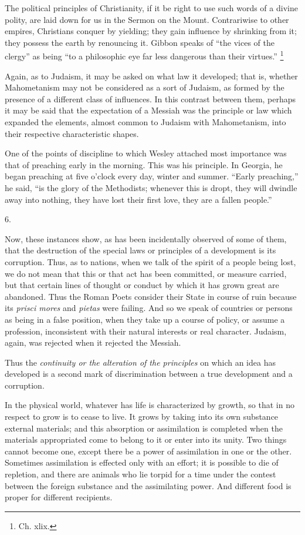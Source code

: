 The political principles of Christianity, if it be
right to use such words of a divine polity, are laid down
for us in the Sermon on the Mount. Contrariwise to other
empires, Christians conquer by yielding; they gain
influence by shrinking from it; they possess the earth by
renouncing it. Gibbon speaks of ``the vices of the
clergy'' as being ``to a philosophic eye far less
dangerous than their virtues.'' \footnote{Ch. xlix.}

Again, as to Judaism, it may be asked on what law it
developed; that is, whether Mahometanism may not be
considered as a sort of Judaism, as formed by the
presence of a different class of influences. In this
contrast between them, perhaps it may be said that the
expectation of a Messiah was the principle or law which
expanded the elements, almost common to Judaism with
Mahometanism, into their respective characteristic
shapes.

One of the points of discipline to which Wesley
attached most importance was that of preaching early in
the morning. This was his principle. In Georgia, he began
preaching at five o'clock every day, winter and summer.
``Early preaching,'' he said, ``is the glory
of the Methodists; whenever this is dropt, they will
dwindle away into nothing, they have lost their first
love, they are a fallen people.''

6.

Now, these instances show, as has been incidentally
observed of some of them, that the destruction of the
special laws or principles of a development is its
corruption. Thus, as to nations, when we talk of the
spirit of a people being lost, we do not mean that this
or that act has been committed, or measure carried, but
that certain lines of thought or conduct by which it has
grown great are abandoned. Thus the Roman Poets consider
their State in course of ruin because its \emph{prisci mores}
and \emph{pietas} were failing. And so we speak of
countries or persons as being in a false position, when
they take up a course of policy, or assume a profession,
inconsistent with their natural interests or real
character. Judaism, again, was rejected when it rejected
the Messiah.

Thus the \emph{continuity or the alteration of the
principles} on which an idea has developed is a second
mark of discrimination between a true development and a
corruption.


In the physical world, whatever has life is
characterized by growth, so that in no respect to grow is
to cease to live. It grows by taking into its own
substance external materials; and this absorption or
assimilation is completed when the materials appropriated
come to belong to it or enter into its unity. Two things
cannot become one, except there be a power of
assimilation in one or the other. Sometimes assimilation
is effected only with an effort; it is possible to die of
repletion, and there are animals who lie torpid for a
time under the contest between the foreign substance and
the assimilating power. And different food is proper for
different recipients.

